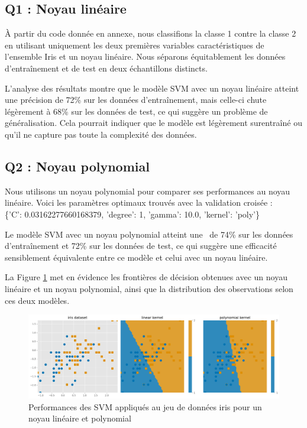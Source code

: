 \documentclass{scrartcl}
\begin{document}
\subsection{Q1 : Noyau linéaire}
\hspace{7pt} À partir du code donnée en annexe, nous classifions la classe 1 contre la classe 2 en utilisant uniquement les deux premières variables caractéristiques de l'ensemble Iris et un noyau linéaire. Nous séparons équitablement les données d'entraînement et de test en deux échantillons distincts.\newline

L'analyse des résultats montre que le modèle SVM avec un noyau linéaire atteint une précision de 72\% sur les données d'entraînement, mais celle-ci chute légèrement à 68\% sur les données de test, ce qui suggère un problème de généralisation. Cela pourrait indiquer que le modèle est légèrement surentraîné ou qu'il ne capture pas toute la complexité des données.

\subsection{Q2 : Noyau polynomial}

\hspace{7pt} Nous utilisons un noyau polynomial pour comparer ses performances au noyau linéaire. Voici les paramètres optimaux trouvés avec la validation croisée :\\
\{'C': 0.03162277660168379, 'degree': 1, 'gamma': 10.0, 'kernel': 'poly'\}\newline

Le modèle SVM avec un noyau polynomial atteint une \ de 74\% sur les données d'entraînement et 72\% sur les données de test, ce qui suggère une efficacité sensiblement équivalente entre ce modèle et celui avec un noyau linéaire.\newline

La Figure \ref{fig:noyaux} met en évidence les frontières de décision obtenues avec un noyau linéaire et un noyau polynomial, ainsi que la distribution des observations selon ces deux modèles.\newline

\begin{figure}[h!]
    \centering
    \includegraphics[width=1\textwidth]{../images/iris.png}
    \caption{\centering Performances des SVM appliqués au jeu de données iris pour un noyau linéaire et polynomial} 
    \label{fig:noyaux}
\end{figure}
\end{document}
